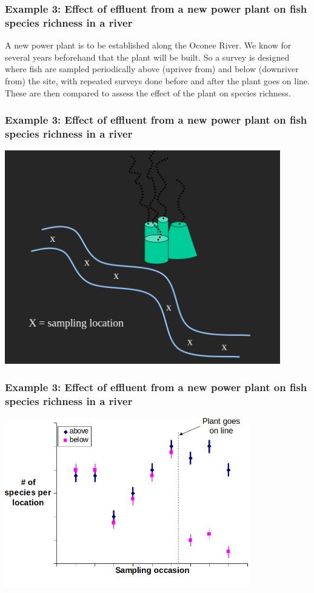\documentclass[color=usenames,dvipsnames]{beamer}\usepackage[]{graphicx}\usepackage[]{xcolor}
\begin{document}
\begin{frame}
  \frametitle{Example 3: Effect of effluent from a new power plant on
    fish species richness in a river}
  A new power plant is to be established along the Oconee River.  We
  know for several years beforehand that the plant will be built.  So
  a survey is designed where fish are sampled periodically above
  (upriver from) and below (downriver from) the site, with repeated
  surveys done before and after the plant goes on line.  These are
  then compared to assess the effect of the plant on species richness.   
\end{frame}


\begin{frame}
  \frametitle{Example 3: Effect of effluent from a new power plant on
    fish species richness in a river}
  \centering
  \includegraphics[width=0.9\textwidth]{power-plant-river} \\
\end{frame}


\begin{frame}
  \frametitle{Example 3: Effect of effluent from a new power plant on
    fish species richness in a river}
  \centering
  \includegraphics[width=0.8\textwidth]{power-plant} \\
\end{frame}
\end{document}
